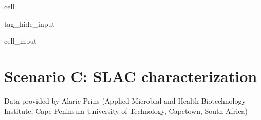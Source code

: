 \documentclass[letterpaper,12pt,english]{jupyterBook}
\begin{document}
\begin{sphinxuseclass}{cell}
\begin{sphinxuseclass}{tag_hide_input}
\begin{sphinxVerbatimInput}
\begin{sphinxuseclass}{cell_input}
\begin{sphinxVerbatim}[commandchars=\\\{\}]
      
        \PYG{p}{[}\PYG{p}{]}

      
        \PYG{p}{[}  \PYG{p}{]}

      

      
     
\end{sphinxVerbatim}

\end{sphinxuseclass}\end{sphinxVerbatimInput}

\end{sphinxuseclass}
\end{sphinxuseclass}
\sphinxstepscope


\section{Scenario C: SLAC characterization}
\label{\detokenize{scenarios/SLAC_kinetic_characterization:scenario-c-br-slac-characterization}}\label{\detokenize{scenarios/SLAC_kinetic_characterization::doc}}
\sphinxAtStartPar
Data provided by Alaric Prins (Applied Microbial and Health Biotechnology Institute, Cape Peninsula University of Technology, Capetown, South Africa)
\end{document}
